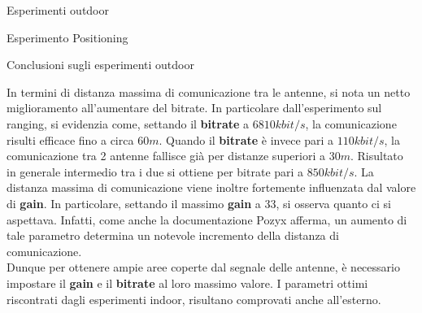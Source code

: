 \documentclass[12pt]{report}
\begin{document}
\begin{section}{Esperimenti outdoor}
\begin{subsection}{Esperimento Positioning}
		\end{subsection}

		\begin{subsection}{Conclusioni sugli esperimenti outdoor}
				
				In termini di distanza massima di comunicazione tra le antenne, si nota un netto miglioramento all’aumentare del bitrate. In particolare dall’esperimento sul ranging, si evidenzia come, settando il \textbf{bitrate} a $6810 kbit/s$, la comunicazione risulti efficace fino a circa $60m$. Quando il \textbf{bitrate} è 					invece pari a $110 kbit/s$, la comunicazione tra 2 antenne fallisce già per distanze superiori a $30m$. Risultato in generale intermedio tra i due si ottiene per bitrate pari a $850kbit/s$.
				La distanza massima di comunicazione viene inoltre fortemente influenzata dal valore di \textbf{gain}. In particolare, settando il massimo \textbf{gain} a 33, si osserva quanto ci si aspettava. Infatti, come anche la documentazione Pozyx afferma, un aumento di  tale parametro determina un notevole 								incremento della distanza di comunicazione.\\
				Dunque per ottenere ampie aree coperte dal segnale delle antenne, è necessario impostare il \textbf{gain} e il \textbf{bitrate} al loro massimo valore. I parametri ottimi riscontrati dagli esperimenti indoor, risultano comprovati anche all'esterno.

		\end{subsection}

	\end{section}
\end{document}
